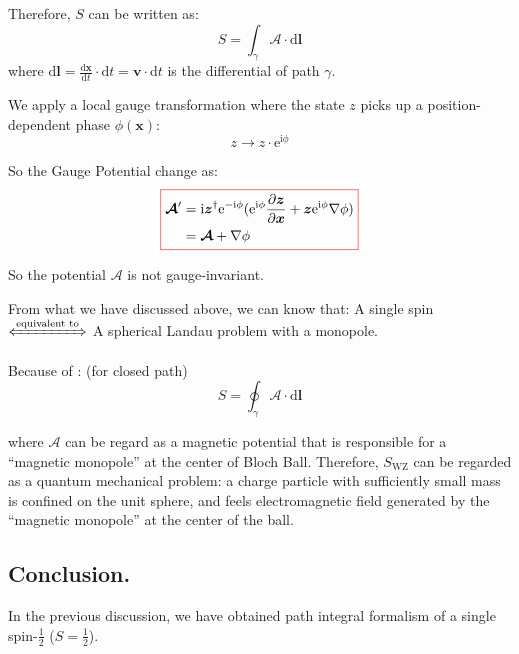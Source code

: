 Therefore, $S$ can be written as:
\begin{equation}
S = \int_{\gamma} \bm{\mathcal{A}} \cdot \mathrm{d}\bm{l}
\end{equation}
where $\mathrm{d}\bm{l} = \frac{\mathrm{d}\bm{x}}{\mathrm{d}t} \cdot \mathrm{d}t = \bm{v} \cdot \mathrm{d}t$ is the differential of path $\gamma$.

We apply a local gauge transformation 
where the state $z$ picks up a position-dependent phase $\phi(\bm{x})$:
\begin{equation}
z \rightarrow z \cdot \mathrm{e}^{\mathrm{i}\phi}
\end{equation}

So the Gauge Potential change as:
\begin{equation}
    \colorboxed{
    \begin{aligned}
    \bm{\mathcal{A}}' &= \mathrm{i} \bm{z}^{\dagger} \mathrm{e}^{-\mathrm{i}\phi} (\mathrm{e}^{\mathrm{i}\phi} \frac{\partial \bm{z}}{\partial \bm{x}} + \bm{z} \mathrm{e}^{\mathrm{i}\phi} \nabla \phi) \\
    &= \bm{\mathcal{A}} + \nabla \phi
    \end{aligned}
    }
\end{equation}

So the potential $\bm{\mathcal{A}}$ is not gauge-invariant.

From what we have discussed above, we can know that:
A single spin $\xLeftrightarrow{\text{equivalent to}}$ A spherical Landau problem with a monopole.

Because of : (for closed path)
\begin{equation}
S = \oint_{\gamma} \bm{\mathcal{A}} \cdot \mathrm{d}\bm{l}
\end{equation}

where $\bm{\mathcal{A}}$ can be regard as a magnetic potential that is responsible for a ``magnetic monopole'' at the center of Bloch Ball. Therefore, $S_{\mathrm{WZ}}$ can be regarded as a quantum mechanical problem: a charge particle with sufficiently small mass is confined on the unit sphere, and feels electromagnetic field generated by the ``magnetic monopole'' at the center of the ball.



\subsection{Conclusion.}

In the previous discussion, we have obtained path integral formalism of a single spin-$\frac{1}{2}$ ($S=\frac{1}{2}$).

